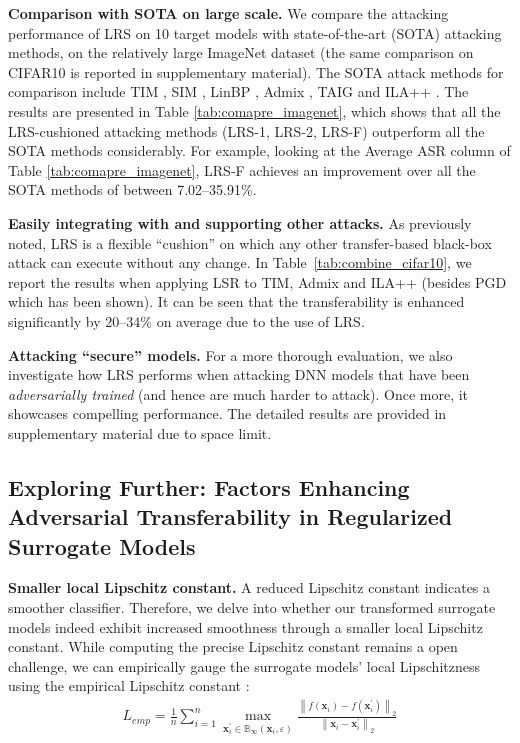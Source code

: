 \documentclass[letterpaper]{article} %
\theoremstyle{plain}
\theoremstyle{definition}
\newcommand{\tref}[1]{Table~\ref{#1}}
\begin{document}
\textbf{Comparison with SOTA on large scale.}
We compare the attacking performance of LRS on 10 target models with state-of-the-art (SOTA) attacking methods, on the relatively large ImageNet dataset (the same comparison on CIFAR10 is reported in supplementary material). The SOTA attack methods for comparison include TIM \cite{dong2019evading}, SIM \cite{lin2020nesterov}, LinBP \cite{guo2020backpropagating}, Admix \cite{wang2021admix}, TAIG \cite{huang2022transferable} and ILA++ \cite{guo2022intermediate}. The results are presented in Table \ref{tab:comapre_imagenet}, which shows that all the LRS-cushioned attacking methods (LRS-1, LRS-2, LRS-F) outperform all the SOTA methods considerably. For example, looking at the Average ASR column of Table \ref{tab:comapre_imagenet}, LRS-F achieves an improvement over all the SOTA methods of between 7.02--35.91\%.



\textbf{Easily integrating with and supporting other attacks.}
As previously noted, LRS is a flexible ``cushion'' on which any other transfer-based black-box attack can execute without any change. In \tref{tab:combine_cifar10}, we report the results when applying LSR to TIM, Admix and ILA++ (besides PGD which has been shown). It can be seen that the transferability is enhanced significantly by 20--34\% on average due to the use of LRS. %

\textbf{Attacking ``secure'' models.}
For a more thorough evaluation, we also investigate how LRS performs when attacking DNN models that have been {\em adversarially trained} (and hence are much harder to attack). Once more, it showcases compelling performance. The detailed results are provided in supplementary material due to space limit.


\subsection{Exploring Further: Factors Enhancing Adversarial Transferability in Regularized Surrogate Models}

\textbf{Smaller local Lipschitz constant.}
A reduced Lipschitz constant indicates a smoother classifier. Therefore, we delve into whether our transformed surrogate models indeed exhibit increased smoothness through a smaller local Lipschitz constant. While computing the precise Lipschitz constant remains a open challenge, we can empirically gauge the surrogate models' local Lipschitzness using the empirical Lipschitz constant \cite{yang2020closer}:
\begin{align}\label{eq:lip_emp}
L_{emp} = \frac{1}{n} \sum_{i=1}^n \max _{\boldsymbol{x}_i^{\prime} \in \mathbb{B}_{\infty}\left(\boldsymbol{x}_i, \varepsilon\right)} \frac{\left\|f\left(\boldsymbol{x}_i\right)-f\left(\boldsymbol{x}_i^{\prime}\right)\right\|_2}{\left\|\boldsymbol{x}_i-\boldsymbol{x}_i^{\prime}\right\|_{2}}
\end{align}
\end{document}
